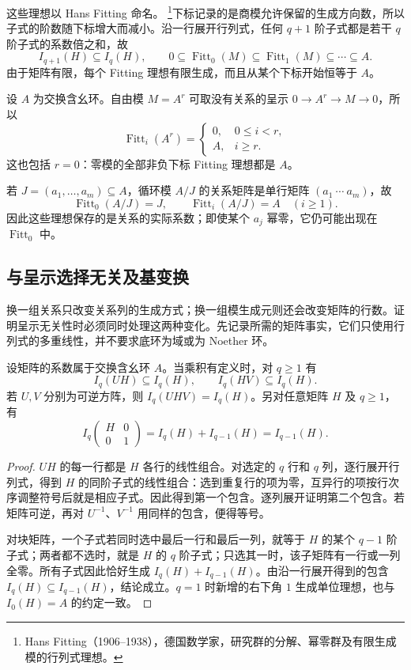 这些理想以 Hans Fitting 命名。
\footnote{Hans Fitting（1906--1938），德国数学家，研究群的分解、幂零群及有限生成模的行列式理想。}下标记录的是商模允许保留的生成方向数，所以子式的阶数随下标增大而减小。沿一行展开行列式，任何 \(q+1\) 阶子式都是若干 \(q\) 阶子式的系数倍之和，故
\[
	I_{q+1}(H)\subseteq I_q(H),\qquad
	0\subseteq\operatorname{Fitt}_0(M)
	\subseteq\operatorname{Fitt}_1(M)\subseteq\cdots\subseteq A.
\]
由于矩阵有限，每个 Fitting 理想有限生成，而且从某个下标开始恒等于 \(A\)。

\begin{example}\label{g5:exm:fitting-free-cyclic}
	设 \(A\) 为交换含幺环。自由模 \(M=A^r\) 可取没有关系的呈示 \(0\to A^r\to M\to0\)，所以
	\[
		\operatorname{Fitt}_i(A^r)=
		\begin{cases}0,&0\leq i<r,\\A,&i\geq r.\end{cases}
	\]
	这也包括 \(r=0\)：零模的全部非负下标 Fitting 理想都是 \(A\)。

	若 \(J=(a_1,\ldots,a_m)\subseteq A\)，循环模 \(A/J\) 的关系矩阵是单行矩阵 \((a_1\ \cdots\ a_m)\)，故
	\[
		\operatorname{Fitt}_0(A/J)=J,
		\qquad\operatorname{Fitt}_i(A/J)=A\quad(i\geq1).
	\]
	因此这些理想保存的是关系的实际系数；即使某个 \(a_j\) 幂零，它仍可能出现在 \(\operatorname{Fitt}_0\) 中。
\end{example}

\subsection{与呈示选择无关及基变换}
\label{g5:subsec:0602:02}

换一组关系只改变关系列的生成方式；换一组模生成元则还会改变矩阵的行数。证明呈示无关性时必须同时处理这两种变化。先记录所需的矩阵事实，它们只使用行列式的多重线性，并不要求底环为域或为 Noether 环。

\begin{lemma}\label{g5:lem:determinantal-matrix-operations}
	设矩阵的系数属于交换含幺环 \(A\)。当乘积有定义时，对 \(q\geq1\) 有
	\[
		I_q(UH)\subseteq I_q(H),\qquad
		I_q(HV)\subseteq I_q(H).
	\]
	若 \(U,V\) 分别为可逆方阵，则 \(I_q(UHV)=I_q(H)\)。另对任意矩阵 \(H\) 及 \(q\geq1\)，有
	\[
		I_q\!\begin{pmatrix}H&0\\0&1\end{pmatrix}
		=I_q(H)+I_{q-1}(H)=I_{q-1}(H).
	\]
\end{lemma}
\begin{proof}
	\(UH\) 的每一行都是 \(H\) 各行的线性组合。对选定的 \(q\) 行和 \(q\) 列，逐行展开行列式，得到 \(H\) 的同阶子式的线性组合：选到重复行的项为零，互异行的项按行次序调整符号后就是相应子式。因此得到第一个包含。逐列展开证明第二个包含。若矩阵可逆，再对 \(U^{-1}\)、\(V^{-1}\) 用同样的包含，便得等号。

	对块矩阵，一个子式若同时选中最后一行和最后一列，就等于 \(H\) 的某个 \(q-1\) 阶子式；两者都不选时，就是 \(H\) 的 \(q\) 阶子式；只选其一时，该子矩阵有一行或一列全零。所有子式因此恰好生成 \(I_q(H)+I_{q-1}(H)\)。由沿一行展开得到的包含 \(I_q(H)\subseteq I_{q-1}(H)\)，结论成立。\(q=1\) 时新增的右下角 \(1\) 生成单位理想，也与 \(I_0(H)=A\) 的约定一致。
\end{proof}

